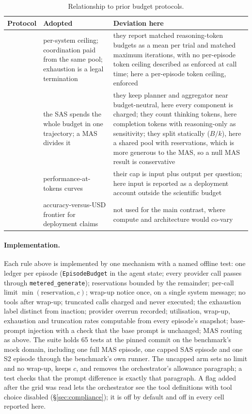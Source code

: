 \begin{table}[tbp]
\caption{Relationship to prior budget protocols.}
\label{tab:protocols}
\begin{center}
\footnotesize
\begin{tabular}{@{}>{\raggedright\arraybackslash}p{2.3cm}>{\raggedright\arraybackslash}p{5.2cm}>{\raggedright\arraybackslash}p{7.9cm}@{}}
\toprule
Protocol & Adopted & Deviation here \\
\midrule
\citet{kim2026capable} & per-system ceiling; coordination paid from the same pool; exhaustion is a legal termination & they report matched reasoning-token budgets as a mean per trial and matched maximum iterations, with no per-episode token ceiling described as enforced at call time; here a per-episode token ceiling, enforced \\
\citet{tran2026single} & the SAS spends the whole budget in one trajectory; a MAS divides it & they keep planner and aggregator near budget-neutral, here every component is charged; they count thinking tokens, here completion tokens with reasoning-only as sensitivity; they split statically ($B/k$), here a shared pool with reservations, which is more generous to the MAS, so a null MAS result is conservative \\
\citet{wang2024token} & performance-at-tokens curves & their cap is input plus output per question; here input is reported as a deployment account outside the scientific budget \\
\citet{kapoor2024agents} & accuracy-versus-USD frontier for deployment claims & not used for the main contrast, where compute and architecture would co-vary \\
\bottomrule
\end{tabular}
\end{center}
\end{table}

\paragraph{Implementation.} Each rule above is implemented by one mechanism with a named offline test: one ledger per episode (\texttt{EpisodeBudget} in the agent state; every provider call passes through \texttt{metered\_generate}); reservations bounded by the remainder; per-call limit $\min(\text{reservation}, c)$; wrap-up notice once, on a single system message; no tools after wrap-up; truncated calls charged and never executed; the exhaustion label distinct from inaction; provider overrun recorded; utilisation, wrap-up, exhaustion and truncation rates computable from every episode's snapshot; base-prompt injection with a check that the base prompt is unchanged; MAS routing as above. The suite holds 65 tests at the pinned commit on the benchmark's mock domain, including one full MAS episode, one capped SAS episode and one S2 episode through the benchmark's own runner. The uncapped arm sets no limit and no wrap-up, keeps $c$, and removes the orchestrator's allowance paragraph; a test checks that the prompt difference is exactly that paragraph. A flag added after the grid was read lets the orchestrator see the tool definitions with tool choice disabled (\S\ref{sec:compliance}); it is off by default and off in every cell reported here.

